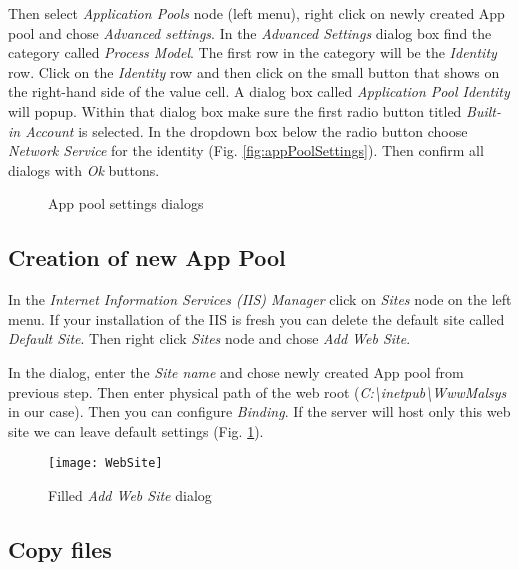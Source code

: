 Then select \emph{Application Pools} node (left menu), right click on newly created App pool and chose \emph{Advanced settings}.
In the \emph{Advanced Settings} dialog box find the category called \emph{Process Model}.
The first row in the category will be the \emph{Identity} row.
Click on the \emph{Identity} row and then click on the small button that shows on the right-hand side of the value cell.
A dialog box called \emph{Application Pool Identity} will popup.
Within that dialog box make sure the first radio button titled \emph{Built-in Account} is selected.
In the dropdown box below the radio button choose \emph{Network Service} for the identity (Fig. \ref{fig:appPoolSettings}).
Then confirm all dialogs with \emph{Ok} buttons.

\begin{figure}[h!]
	 \hfill
	\caption{App pool settings dialogs}
\end{figure}


\subsection{Creation of new App Pool}

In the \emph{Internet Information Services (IIS) Manager} click on \emph{Sites} node on the left menu.
If your installation of the IIS is fresh you can delete the default site called \emph{Default Site}.
Then right click \emph{Sites} node and chose \emph{Add Web Site}.

In the dialog, enter the \emph{Site name} and chose newly created App pool from previous step.
Then enter physical path of the web root (\emph{C:\textbackslash{}inetpub\textbackslash{}WwwMalsys} in our case).
Then you can configure \emph{Binding}.
If the server will host only this web site we can leave default settings (Fig. \ref{fig:addWebSite}).

\begin{figure}[h!]
	\centering
	\texttt{[image: WebSite]}
	\caption{Filled \emph{Add Web Site} dialog}	
	\label{fig:addWebSite}
\end{figure}


\subsection{Copy files}


